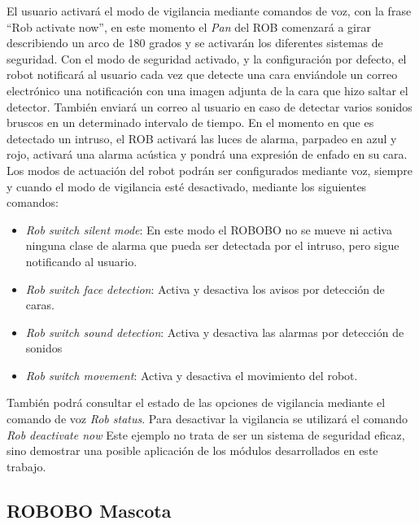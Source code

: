 El usuario activará el modo de vigilancia mediante comandos de voz, con la frase \enquote{Rob activate now}, en este momento el \textit{Pan} del ROB comenzará a girar describiendo un arco de 180 grados y se activarán los diferentes sistemas de seguridad.
Con el modo de seguridad activado, y la configuración por defecto, el  robot notificará al usuario cada vez que detecte una cara enviándole un correo electrónico una notificación con una imagen adjunta de la cara que hizo saltar el detector. También enviará un correo al usuario en caso de detectar varios sonidos bruscos en un determinado intervalo de tiempo.
En el momento en que es detectado un intruso, el ROB activará las luces de alarma, parpadeo en azul y rojo, activará una alarma acústica y pondrá una expresión de enfado en su cara.
Los modos de actuación del robot podrán ser configurados mediante voz, siempre y cuando el modo de vigilancia esté desactivado, mediante los siguientes comandos:
\begin{itemize}
	\item \textit{Rob switch silent mode}: En este modo el ROBOBO no se mueve ni activa ninguna clase de alarma que pueda ser detectada por el intruso, pero sigue notificando al usuario.
	\item \textit{Rob switch face detection}: Activa y desactiva los avisos por detección de caras.
	\item \textit{Rob switch sound detection}: Activa y desactiva las alarmas por detección de sonidos
	\item \textit{Rob switch movement}: Activa y desactiva el movimiento del robot.
\end{itemize}
También podrá consultar el estado de las opciones de vigilancia mediante el comando de voz \textit{Rob status}.
Para desactivar la vigilancia se utilizará el comando \textit{Rob deactivate now}
Este ejemplo no trata de ser un sistema de seguridad eficaz, sino demostrar una posible aplicación de los módulos desarrollados en este trabajo.

\subsection{ROBOBO Mascota}
\label{subsec:robobo-mascota}



